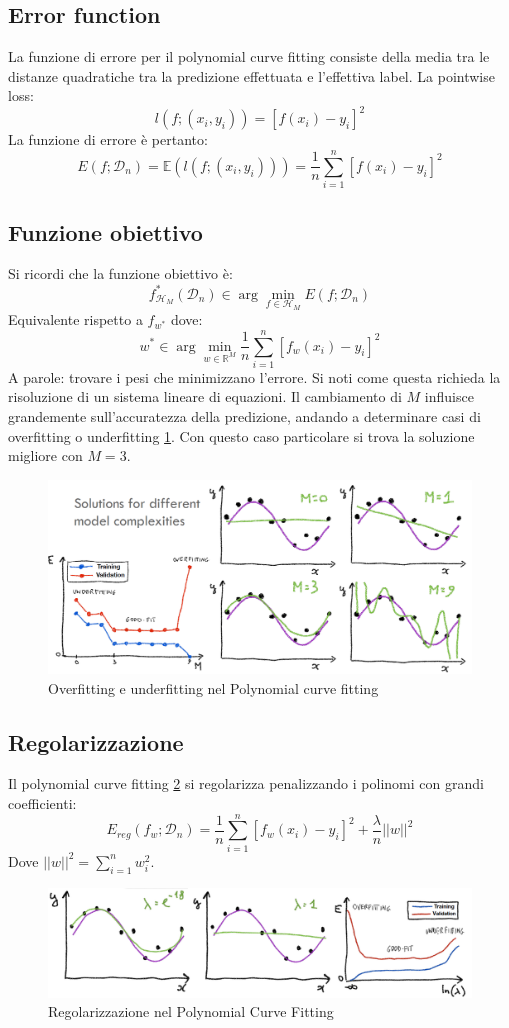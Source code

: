 \subsection{Error function}
La funzione di errore per il polynomial curve fitting consiste della media tra le distanze quadratiche tra la predizione effettuata e l'effettiva label.
La pointwise loss:
$$l(f;(x_i,y_i)) = [f(x_i) - y_i]^2$$
La funzione di errore \`e pertanto:
$$E(f;\mathcal{D}_n) = \mathbb{E}(l(f;(x_i,y_i))) = \frac{1}{n}\sum\limits_{i=1}^n[f(x_i)-y_i]^2$$

\subsection{Funzione obiettivo}
Si ricordi che la funzione obiettivo \`e:
$$f^*_{\mathcal{H}_M}(\mathcal{D}_n)\in\arg\min\limits_{f\in\mathcal{H}_M}E(f;\mathcal{D}_n)$$
Equivalente rispetto a $f_{w^*}$ dove:
$$w^*\in\arg\min\limits_{w\in\mathbb{R}^M}\frac{1}{n}\sum\limits_{i=1}^n[f_w(x_i)-y_i]^2$$
A parole: trovare i pesi che minimizzano l'errore. Si noti come questa richieda la risoluzione di un sistema lineare di equazioni.
Il cambiamento di $M$ influisce grandemente sull'accuratezza della predizione, andando a determinare casi di overfitting o underfitting \ref{fig:chapter02-12}.
Con questo caso particolare si trova la soluzione migliore con $M=3$.

\begin{figure}
	\centering
	\includegraphics[width=0.6\linewidth]{imgs/chapter2/img12}
	\caption{Overfitting e underfitting nel Polynomial curve fitting}
	\label{fig:chapter02-12}
\end{figure}

\subsection{Regolarizzazione}
Il polynomial curve fitting \ref{fig:chapter02-8} si regolarizza penalizzando i polinomi con grandi coefficienti:
$$E_{reg}(f_w;\mathcal{D}_n) = \frac{1}{n}\sum\limits_{i=1}^n[f_w(x_i)-y_i]^2 + \frac{\lambda}{n}||w||^2$$
Dove $||w||^2 = \sum\limits_{i = 1}^n w_i^2$.

\begin{figure}
	\centering
	\includegraphics[width=0.6\linewidth]{imgs/chapter2/img8}
	\caption{Regolarizzazione nel Polynomial Curve Fitting}
	\label{fig:chapter02-8}
\end{figure}
